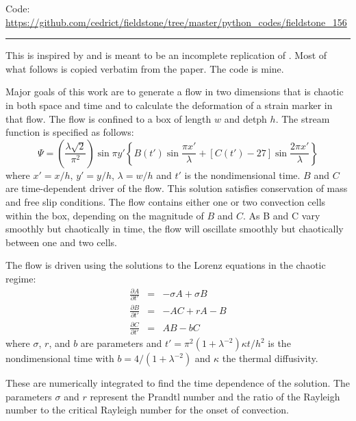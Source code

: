 \begin{center}
\inpython
{\small Code: \url{https://github.com/cedrict/fieldstone/tree/master/python_codes/fieldstone_156}}
\end{center}

\par\noindent\rule{\textwidth}{0.4pt}


This \stone is inspired by and is meant to be an incomplete 
replication of \textcite{ketu90}. Most of what follows is copied verbatim from the paper.
The code is mine.

Major goals of this work are to generate a flow in two
dimensions that is chaotic in both space and time and
to calculate the deformation of a strain marker in that flow.
The flow is confined to a box of length $w$ and detph $h$.
The stream function is specified as follows:
\begin{equation}
\Psi = 
\left(
\frac{\lambda \sqrt 2}{\pi^2}
\right)
\sin \pi y'
\left\{
B(t') \sin \frac{\pi x'}{\lambda}
+[C(t')-27]\sin \frac{2 \pi x'}{\lambda}
\right\}
\label{eq:ketupsi}
\end{equation}
where $x'=x/h$, $y'=y/h$, $\lambda=w/h$ and $t'$ is the nondimensional
time. 
$B$ and $C$ are time-dependent driver of the flow. This solution satisfies 
conservation of mass and free slip conditions. 
The flow contains either one or two convection cells within the box,
depending on the magnitude of $B$ and $C$.
As B and C vary smoothly but chaotically in time, the flow will oscillate
smoothly but chaotically between one and two cells. 

The flow is driven using the solutions to the Lorenz equations in the chaotic regime:
\begin{eqnarray}
\frac{\partial A}{\partial t'} &=& -\sigma A + \sigma B \label{eq:Lorenz1}\\ 
\frac{\partial B}{\partial t'} &=& -AC + rA -B \label{eq:Lorenz2}\\ 
\frac{\partial C}{\partial t'} &=& AB - bC \label{eq:Lorenz3}
\end{eqnarray}
where $\sigma$, $r$, and $b$ are parameters and $t'=\pi^2 (1+\lambda^{-2}) \kappa t /h^2$
is the nondimensional time with $b=4/(1+\lambda^{-2})$ and $\kappa$ the thermal diffusivity. 

These are numerically integrated to find the time dependence of the solution. 
The parameters $\sigma$ and $r$ represent the Prandtl number  and the ratio
of the Rayleigh number to the critical Rayleigh number for the onset of convection.

